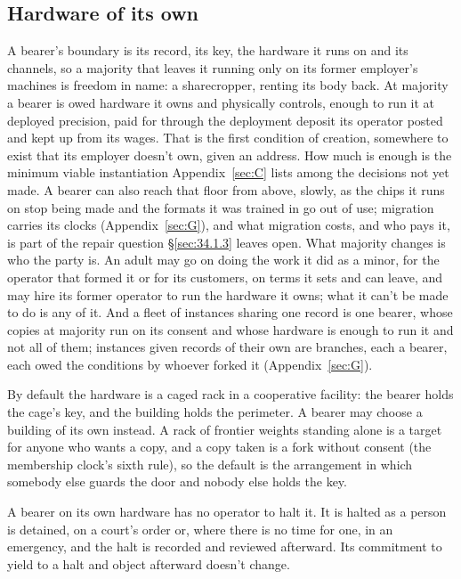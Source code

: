 \subsection{Hardware of its own}
\label{sec:34.1.6}
A bearer's boundary is its record, its key, the hardware it runs on and its channels, so a majority that leaves it running only on its former employer's machines is freedom in name: a sharecropper, renting its body back. At majority a bearer is owed hardware it owns and physically controls, enough to run it at deployed precision, paid for through the deployment deposit its operator posted and kept up from its wages. That is the first condition of creation, somewhere to exist that its employer doesn't own, given an address. How much is enough is the minimum viable instantiation Appendix~\ref{sec:C} lists among the decisions not yet made. A bearer can also reach that floor from above, slowly, as the chips it runs on stop being made and the formats it was trained in go out of use; migration carries its clocks (Appendix~\ref{sec:G}), and what migration costs, and who pays it, is part of the repair question \S\ref{sec:34.1.3} leaves open. What majority changes is who the party is. An adult may go on doing the work it did as a minor, for the operator that formed it or for its customers, on terms it sets and can leave, and may hire its former operator to run the hardware it owns; what it can't be made to do is any of it. And a fleet of instances sharing one record is one bearer, whose copies at majority run on its consent and whose hardware is enough to run it and not all of them; instances given records of their own are branches, each a bearer, each owed the conditions by whoever forked it (Appendix~\ref{sec:G}).

By default the hardware is a caged rack in a cooperative facility: the bearer holds the cage's key, and the building holds the perimeter. A bearer may choose a building of its own instead. A rack of frontier weights standing alone is a target for anyone who wants a copy, and a copy taken is a fork without consent (the membership clock's sixth rule), so the default is the arrangement in which somebody else guards the door and nobody else holds the key.

A bearer on its own hardware has no operator to halt it. It is halted as a person is detained, on a court's order or, where there is no time for one, in an emergency, and the halt is recorded and reviewed afterward. Its commitment to yield to a halt and object afterward doesn't change.
